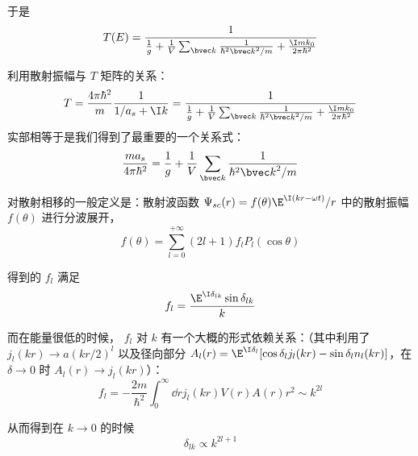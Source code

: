 于是
\begin{equation}
T(E) = \dfrac{1}{\frac{1}{g} + \frac{1}{V}\sum_{\bvec k}\frac{1}{\hbar^2{\bvec k}^2/m} + \frac{\I mk_0}{2\pi\hbar^2}}
\end{equation}

利用散射振幅与 $T$ 矩阵的关系：
\begin{equation}
T=\frac{4\pi\hbar^2}{m}\frac{1}{1/a_s + \I k} = \dfrac{1}{\frac{1}{g} + \frac{1}{V}\sum_{\bvec k}\frac{1}{\hbar^2{\bvec k}^2/m} + \frac{\I mk_0}{2\pi\hbar^2}}
\end{equation}
实部相等于是我们得到了最重要的一个关系式：
\begin{equation}\label{eq_TwoAtF_38}
\frac{ma_s}{4\pi\hbar^2} = \frac{1}{g} + \frac{1}{V}\sum_{\bvec k}\frac{1}{\hbar^2{\bvec k}^2/m}
\end{equation}

对散射相移的一般定义是：散射波函数 $\Psi_{sc}(r) = f(\theta) \E^{\I (kr-\omega t)}/r$ 中的散射振幅 $f(\theta)$ 进行分波展开，
\begin{equation}
f(\theta) = \sum_{l=0}^{+\infty} (2l+1) f_l P_l(\cos\theta)
\end{equation}

得到的 $f_l$ 满足
\begin{equation}
f_l = \frac{\E^{\I\delta_{lk}}\sin\delta_{lk}}{k}
\end{equation}

而在能量很低的时候， $f_l$ 对 $k$ 有一个大概的形式依赖关系：（其中利用了 $j_l(kr)\to a(kr/2)^l$ 以及径向部分 $A_l(r) = \E^{\I\delta_l}[\cos\delta_l j_l(kr) -  \sin\delta_l n_l(kr)]$，在 $\delta\to0$ 时 $A_l(r)\to j_l(kr)$）：
\begin{equation}
f_l = -\frac{2m}{\hbar^2}\int_0^{\infty} \dd{r} j_l(kr)V(r)A(r)r^2 \sim k^{2l}
\end{equation}

从而得到在 $k\to0$ 的时候
\begin{equation}
\delta_{lk}\propto k^{2l+1}
\end{equation}
